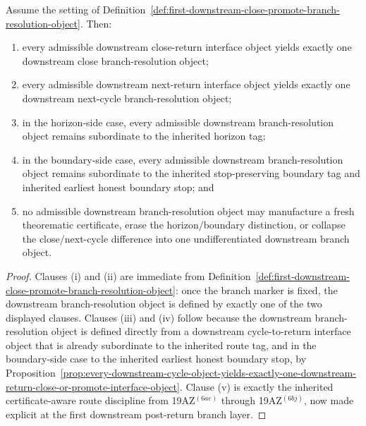 \begin{proposition}
\label{prop:every-downstream-return-interface-object-admits-exactly-one-honest-downstream-close-or-promote-branch-choice}
Assume the setting of Definition~\ref{def:first-downstream-close-promote-branch-resolution-object}. Then:
\begin{enumerate}[label=(\roman*)]
 \item every admissible downstream close-return interface object yields exactly one downstream close branch-resolution object;
 \item every admissible downstream next-return interface object yields exactly one downstream next-cycle branch-resolution object;
 \item in the horizon-side case, every admissible downstream branch-resolution object remains subordinate to the inherited horizon tag;
 \item in the boundary-side case, every admissible downstream branch-resolution object remains subordinate to the inherited stop-preserving boundary tag and inherited earliest honest boundary stop; and
 \item no admissible downstream branch-resolution object may manufacture a fresh theorematic certificate, erase the horizon/boundary distinction, or collapse the close/next-cycle difference into one undifferentiated downstream branch object.
\end{enumerate}
\end{proposition}

\begin{proof}
Clauses (i) and (ii) are immediate from Definition~\ref{def:first-downstream-close-promote-branch-resolution-object}: once the branch marker is fixed, the downstream branch-resolution object is defined by exactly one of the two displayed clauses. Clauses (iii) and (iv) follow because the downstream branch-resolution object is defined directly from a downstream cycle-to-return interface object that is already subordinate to the inherited route tag, and in the boundary-side case to the inherited earliest honest boundary stop, by Proposition~\ref{prop:every-downstream-cycle-object-yields-exactly-one-downstream-return-close-or-promote-interface-object}. Clause (v) is exactly the inherited certificate-aware route discipline from 19AZ$^{(6ae)}$ through 19AZ$^{(6bj)}$, now made explicit at the first downstream post-return branch layer.
\end{proof}

